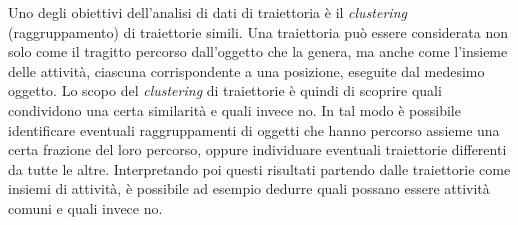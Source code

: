 Uno degli obiettivi dell'analisi di dati di traiettoria è il \textit{clustering} (raggruppamento) di traiettorie simili.
Una traiettoria può essere considerata non solo come il tragitto percorso dall'oggetto che la genera,
ma anche come l'insieme delle attività, ciascuna corrispondente a una posizione, eseguite dal medesimo oggetto.
Lo scopo del \textit{clustering} di traiettorie è quindi di scoprire quali condividono una certa similarità e quali invece no.
In tal modo è possibile identificare eventuali raggruppamenti di oggetti che hanno percorso assieme una certa frazione del loro percorso, oppure individuare eventuali
traiettorie differenti da tutte le altre.
Interpretando poi questi risultati partendo dalle traiettorie come insiemi di attività, è possibile ad esempio dedurre quali possano essere attività comuni e quali invece no.
